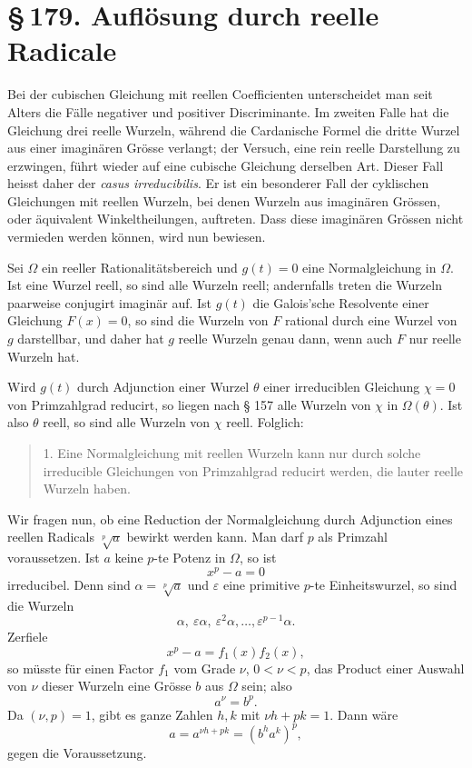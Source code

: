 \documentclass[11pt]{article}
\newcommand{\sect}[2]{\section*{\S\,#1. #2}}
\begin{document}
\sect{179}{Auflösung durch reelle Radicale}

Bei der cubischen Gleichung mit reellen Coefficienten unterscheidet man seit Alters die Fälle negativer und positiver Discriminante. Im zweiten Falle hat die Gleichung drei reelle Wurzeln, während die Cardanische Formel die dritte Wurzel aus einer imaginären Grösse verlangt; der Versuch, eine rein reelle Darstellung zu erzwingen, führt wieder auf eine cubische Gleichung derselben Art. Dieser Fall heisst daher der \emph{casus irreducibilis}. Er ist ein besonderer Fall der cyklischen Gleichungen mit reellen Wurzeln, bei denen Wurzeln aus imaginären Grössen, oder äquivalent Winkeltheilungen, auftreten. Dass diese imaginären Grössen nicht vermieden werden können, wird nun bewiesen.

Sei $\Omega$ ein reeller Rationalitätsbereich und $g(t)=0$ eine Normalgleichung in $\Omega$. Ist eine Wurzel reell, so sind alle Wurzeln reell; andernfalls treten die Wurzeln paarweise conjugirt imaginär auf. Ist $g(t)$ die Galois'sche Resolvente einer Gleichung $F(x)=0$, so sind die Wurzeln von $F$ rational durch eine Wurzel von $g$ darstellbar, und daher hat $g$ reelle Wurzeln genau dann, wenn auch $F$ nur reelle Wurzeln hat.

Wird $g(t)$ durch Adjunction einer Wurzel $\theta$ einer irreduciblen Gleichung $\chi=0$ von Primzahlgrad reducirt, so liegen nach § 157 alle Wurzeln von $\chi$ in $\Omega(\theta)$. Ist also $\theta$ reell, so sind alle Wurzeln von $\chi$ reell. Folglich:
\begin{quote}
1. Eine Normalgleichung mit reellen Wurzeln kann nur durch solche irreducible Gleichungen von Primzahlgrad reducirt werden, die lauter reelle Wurzeln haben.
\end{quote}

Wir fragen nun, ob eine Reduction der Normalgleichung durch Adjunction eines reellen Radicals $\sqrt[p]{a}$ bewirkt werden kann. Man darf $p$ als Primzahl voraussetzen. Ist $a$ keine $p$-te Potenz in $\Omega$, so ist
\[
  x^p-a=0                                                        \tag{2}
\]
irreducibel. Denn sind $\alpha=\sqrt[p]{a}$ und $\varepsilon$ eine primitive $p$-te Einheitswurzel, so sind die Wurzeln
\[
  \alpha,\ \varepsilon\alpha,\ \varepsilon^2\alpha,\ldots,\varepsilon^{p-1}\alpha. \tag{1}
\]
Zerfiele
\[
  x^p-a=f_1(x)f_2(x),                                           \tag{3}
\]
so müsste für einen Factor $f_1$ vom Grade $\nu$, $0<\nu<p$, das Product einer Auswahl von $\nu$ dieser Wurzeln eine Grösse $b$ aus $\Omega$ sein; also
\[
  a^\nu=b^p.                                                    \tag{4}
\]
Da $(\nu,p)=1$, gibt es ganze Zahlen $h,k$ mit $\nu h+pk=1$. Dann wäre
\[
  a=a^{\nu h+pk}=(b^h a^k)^p,
\]
gegen die Voraussetzung.
\end{document}
